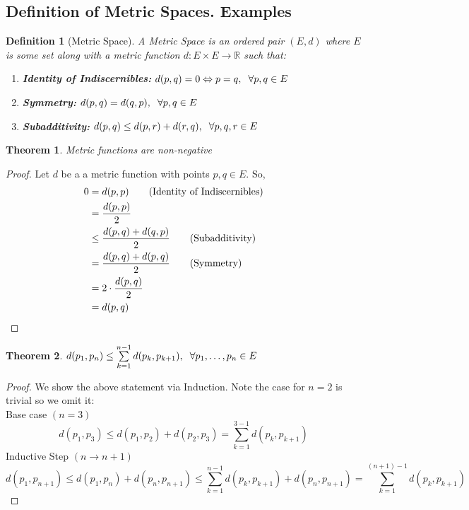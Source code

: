 \documentclass{article}
\newtheorem{definition}{Definition}[section]
\newtheorem{theorem}{Theorem}[section]
\begin{document}
		\subsection{Definition of Metric Spaces. Examples}
			
			\begin{definition}[Metric Space]
				A Metric Space is an ordered pair $(E, d)$ where $E$ is some set along with a metric function $d \colon E \times E \to \mathbb{R}$
				 such that:
				 \begin{enumerate}
				 	\item \textbf{Identity of Indiscernibles:} $d(p,q) = 0 \Leftrightarrow p=q, \hspace{2 mm} \forall p,q \in E$
				 	\item \textbf{Symmetry:} $d(p,q) = d(q,p), \hspace{2 mm} \forall p,q \in E$
				 	\item \textbf{Subadditivity:} $d(p,q) \leq d(p,r) + d(r,q), \hspace{2 mm} \forall p,q,r \in E$
				 \end{enumerate}
			\end{definition}
		
			\begin{theorem}
				Metric functions are non-negative
			\end{theorem}
			\begin{proof}
				Let $d$ be a a metric function with points $p,q \in E$. So,
				\begin{align*}
					0 &= d(p,p) \tag{Identity of Indiscernibles}\\
					  &= \dfrac{d(p,p)}{2}\\
					  &\leq \dfrac{d(p,q) + d(q,p)}{2} \tag{Subadditivity}\\
					  &= \dfrac{d(p,q) + d(p,q)}{2} \tag{Symmetry}\\
					  &= 2 \cdot \dfrac{d(p,q)}{2}\\
					  &= d(p,q) &&\qedhere
				\end{align*}
			\end{proof}

			\begin{theorem}
				$d(p_1,p_n) \leq \sum\limits_{k=1}^{n-1} d(p_k,p_{k+1}), \hspace{2 mm} \forall p_1,\ldots,p_n \in E$
			\end{theorem}
			\begin{proof}
				We show the above statement via Induction. Note the case for $n=2$ is trivial so we omit it: \\
				Base case $(n=3)$
				$$d(p_1,p_3) \leq d(p_1,p_2) + d(p_2,p_3) = \sum\limits_{k=1}^{3-1} d(p_k,p_{k+1})$$
				Inductive Step $\left(n \longrightarrow n+1\right)$
				$$d(p_1,p_{n+1}) \leq d(p_1,p_n) + d(p_n,p_{n+1}) 
								 \leq \sum\limits_{k=1}^{n-1} d(p_k,p_{k+1}) + d(p_n,p_{n+1})
								 = \sum\limits_{k=1}^{(n+1)-1} d(p_k,p_{k+1})$$
			\end{proof}
\end{document}
